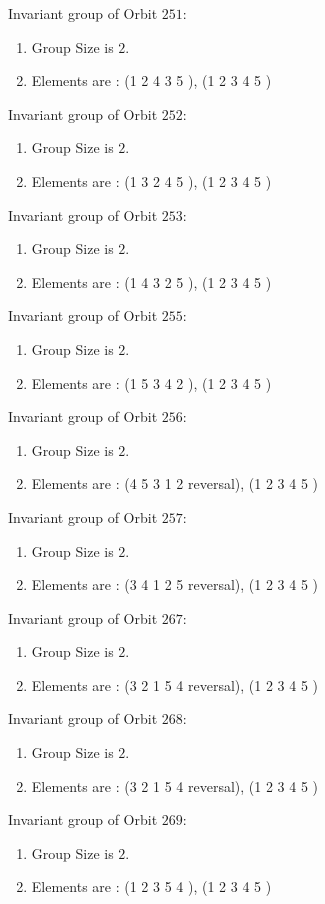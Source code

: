 \documentclass[12pt]{article}
\begin{document}
Invariant group of Orbit $251$:
\begin{enumerate}
\item Group Size is $2$.
\item Elements are : (1 2 4 3 5  ), (1 2 3 4 5  )
\end{enumerate}
Invariant group of Orbit $252$:
\begin{enumerate}
\item Group Size is $2$.
\item Elements are : (1 3 2 4 5  ), (1 2 3 4 5  )
\end{enumerate}
Invariant group of Orbit $253$:
\begin{enumerate}
\item Group Size is $2$.
\item Elements are : (1 4 3 2 5  ), (1 2 3 4 5  )
\end{enumerate}
Invariant group of Orbit $255$:
\begin{enumerate}
\item Group Size is $2$.
\item Elements are : (1 5 3 4 2  ), (1 2 3 4 5  )
\end{enumerate}
Invariant group of Orbit $256$:
\begin{enumerate}
\item Group Size is $2$.
\item Elements are : (4 5 3 1 2   reversal), (1 2 3 4 5  )
\end{enumerate}
Invariant group of Orbit $257$:
\begin{enumerate}
\item Group Size is $2$.
\item Elements are : (3 4 1 2 5   reversal), (1 2 3 4 5  )
\end{enumerate}
Invariant group of Orbit $267$:
\begin{enumerate}
\item Group Size is $2$.
\item Elements are : (3 2 1 5 4   reversal), (1 2 3 4 5  )
\end{enumerate}
Invariant group of Orbit $268$:
\begin{enumerate}
\item Group Size is $2$.
\item Elements are : (3 2 1 5 4   reversal), (1 2 3 4 5  )
\end{enumerate}
Invariant group of Orbit $269$:
\begin{enumerate}
\item Group Size is $2$.
\item Elements are : (1 2 3 5 4  ), (1 2 3 4 5  )
\end{enumerate}
\end{document}
